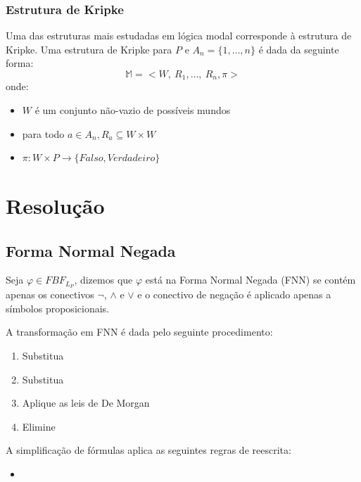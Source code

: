 \subsubsection{Estrutura de Kripke}

Uma das estruturas mais estudadas em lógica modal corresponde à estrutura de
Kripke. Uma estrutura de Kripke para $P$ e $A_n = \{1, \ldots, n\}$ é dada da seguinte forma:
\begin{equation}
\mathbb{M} = <W,\ R_1, \ldots,\ R_n, \pi>
\end{equation}
onde:
\begin{itemize}
    \item $W$ é um conjunto não-vazio de possíveis mundos
    \item para todo $a \in A_n, R_a \subseteq W \times W$
    \item $\pi: W \times P \longrightarrow \{Falso, Verdadeiro\}$
\end{itemize}




\section{Resolução}
\label{sec:resolucao}

\subsection{Forma Normal Negada}
\begin{definition}
    Seja $\varphi \in FBF_{L_P}$, dizemos que $\varphi$ está na Forma Normal
    Negada (FNN) se contém apenas os conectivos $\neg$, $\wedge$ e $\vee$ e o
    conectivo de negação é aplicado apenas a símbolos proposicionais.
\end{definition}

A transformação em FNN é dada pelo seguinte procedimento:
\begin{enumerate}
    \item Substitua
    \item Substitua
    \item Aplique as leis de De Morgan
    \item Elimine
\end{enumerate}

A simplificação de fórmulas aplica as seguintes regras de reescrita:
\begin{itemize}
    \item 
\end{itemize}

